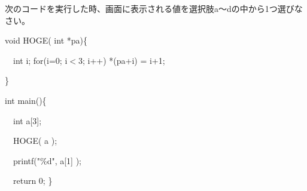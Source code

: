 次のコードを実行した時、画面に表示される値を選択肢a〜dの中から1つ選びなさい。\par
\noindent void HOGE( int *pa)\{ \par
\noindent 　int i; for(i=0; i$<$3; i++) *(pa+i) = i+1; \par
\noindent \} \par
\noindent int main()\{ \par
\noindent 　int a[3]; \par
\noindent 　HOGE( a ); \par
\noindent 　printf("\%d", a[1] ); \par
\noindent 　return 0; \} \par
